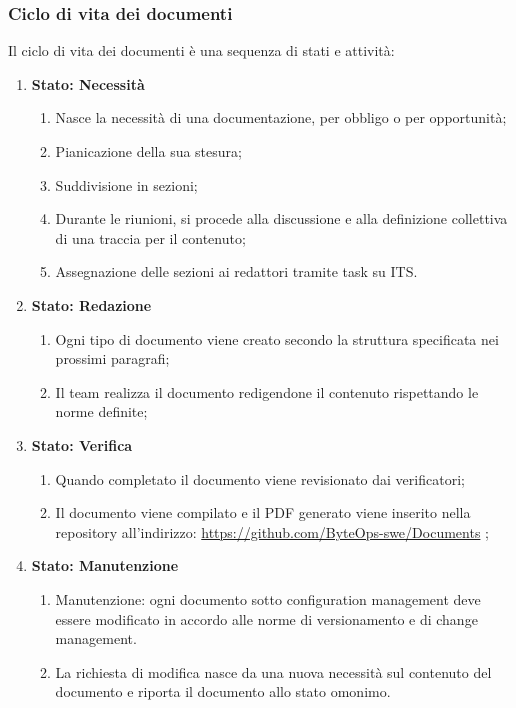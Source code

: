 \documentclass{article}
\begin{document}
\subsubsection{Ciclo di vita dei documenti}
Il ciclo di vita dei documenti è una sequenza di stati e attività:
\begin{enumerate}
    \item \textbf{Stato: Necessità}
          \begin{enumerate}
              \item Nasce la necessità di una documentazione, per obbligo o per opportunità;
              \item Pianicazione della sua stesura;
              \item Suddivisione in sezioni;
              \item Durante le riunioni, si procede alla discussione e alla definizione collettiva di una traccia per il contenuto;
              \item Assegnazione delle sezioni ai redattori tramite task su ITS.
          \end{enumerate}
    \item \textbf{Stato: Redazione}
          \begin{enumerate}
              \item  Ogni tipo di documento viene creato secondo la struttura specificata nei prossimi paragrafi;
              \item Il team realizza il documento redigendone il contenuto rispettando le norme definite;
          \end{enumerate}
    \item \textbf{Stato: Verifica}
          \begin{enumerate}
              \item Quando completato il documento viene revisionato dai verificatori;
              \item Il documento viene compilato e il PDF generato viene inserito nella repository all'indirizzo: \href{https://github.com/ByteOps-swe/Documents} {https://github.com/ByteOps-swe/Documents} ;
          \end{enumerate}
    \item \textbf{Stato: Manutenzione}
          \begin{enumerate}
              \item Manutenzione: ogni documento sotto configuration management deve essere modificato in accordo alle norme di versionamento e di change management.
              \item La richiesta di modifica nasce da una nuova necessità sul contenuto del documento e riporta il documento allo stato omonimo.
          \end{enumerate}
\end{enumerate}
\end{document}
